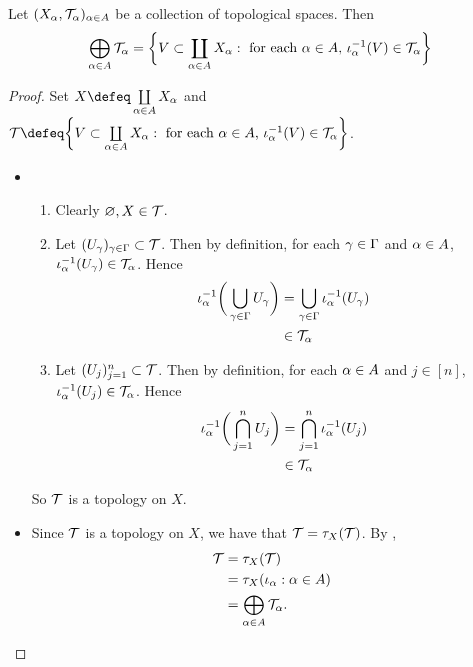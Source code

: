 \documentclass{book}
\begin{document}
	\begin{ex} 
		Let $(X_{\alpha}, \mathcal{T}_{\alpha})_{\alpha \in A}$ be a collection of topological spaces. Then $$\bigoplus\limits_{\alpha \in A} \mathcal{T}_{\alpha} = \bigg\{V \subset \coprod_{\alpha \in A}  X_{\alpha}: \text{ for each $\alpha \in A$, $\iota_{\alpha}^{-1}(V) \in \mathcal{T}_{\alpha}$} \bigg\}$$
	\end{ex}
	
	\begin{proof}
			Set $X \defeq \coprod\limits_{\al \in A}  X_{\al}$ and $\MT \defeq \bigg \{V \subset \coprod\limits_{\al \in A}  X_{\al}: \text{ for each $\al \in A$, $\iota_{\al}^{-1}(V) \in \MT_{\al}$} \bigg\}$. 
		\begin{itemize}
			\item 
			\begin{enumerate}
				\item Clearly $\varnothing, X \in \mathcal{T}$.
				\item Let $(U_{\gamma})_{\gamma \in \Gamma} \subset \mathcal{T}$. Then by definition, for each $\gamma \in \Gamma$ and $\alpha \in A$, $\iota_{\alpha}^{-1}(U_{\gamma}) \in \mathcal{T}_{\alpha}$. Hence
				\begin{align*}
					\iota_{\alpha}^{-1} \bigg( \bigcup_{\gamma \in \Gamma} U_{\gamma} \bigg)
					& = \bigcup_{\gamma \in \Gamma} \iota_{\alpha}^{-1}(U_{\gamma}) \\
					& \in \mathcal{T}_{\alpha}
				\end{align*}
				\item Let $(U_j)_{j=1}^n \subset \mathcal{T}$. Then by definition, for each $\alpha \in A$ and $j \in [n]$, $\iota_{\alpha}^{-1}(U_j) \in \mathcal{T}_{\alpha}$. Hence 
				\begin{align*}
					\iota_{\alpha}^{-1}\bigg( \bigcap_{j=1}^n U_j \bigg)
					& = \bigcap_{j=1}^n \iota_{\alpha}^{-1}(U_j)\\
					& \in \mathcal{T}_{\alpha}
				\end{align*}
			\end{enumerate}
			So $\mathcal{T}$ is a topology on $X$.
			\item Since $\mathcal{T}$ is a topology on $X$, we have that $\mathcal{T} = \tau_X(\mathcal{T})$. By , 
			\begin{align*}
				\mathcal{T}
				& = \tau_X(\mathcal{T}) \\
				& = \tau_X(\iota_{\alpha}: \alpha \in A) \\
				& = \bigoplus\limits_{\alpha \in A} \mathcal{T}_{\alpha}.
			\end{align*}
		\end{itemize}
	\end{proof}
\end{document}
